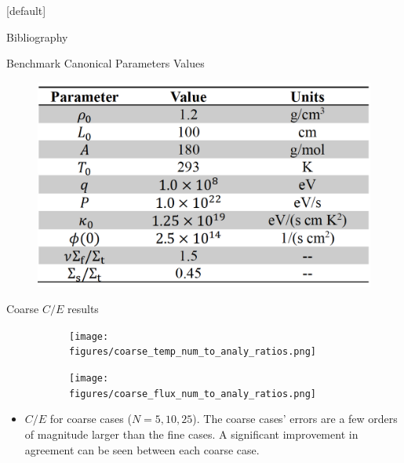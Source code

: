 \documentclass[9pt,t]{beamer}
\makeatletter
\newenvironment{withoutheadline}{
       \setbeamertemplate{headline}[default]
       \def\beamer@entrycode{\vspace*{-\headheight}}
    }{}
\makeatother
\begin{document}
\begin{withoutheadline}
\begin{frame}[allowframebreaks]{Bibliography}
    \printbibliography
\end{frame}
\end{withoutheadline}

\appendix

\begin{frame}{Benchmark Canonical Parameters Values}
    \begin{figure}[T]
        \centering
        \includegraphics[width=\linewidth]{figures/benchmark_values.png}
    \end{figure}
\end{frame}

\begin{frame}{Coarse $C/E$ results}
    \begin{figure}[T]
        \begin{subfigure}{0.475\linewidth}
            \texttt{[image: figures/coarse\_temp\_num\_to\_analy\_ratios.png]}
        \end{subfigure}\hspace{0.3cm}
        \begin{subfigure}{0.475\linewidth}
            \texttt{[image: figures/coarse\_flux\_num\_to\_analy\_ratios.png]}
        \end{subfigure}
    \end{figure}
    \begin{itemize}
        \item $C/E$ for coarse cases ($N=5,10,25$). The coarse cases' errors are a few orders of magnitude larger than the fine cases. A significant improvement in agreement can be seen between each coarse case.
    \end{itemize}
\end{frame}
\end{document}
